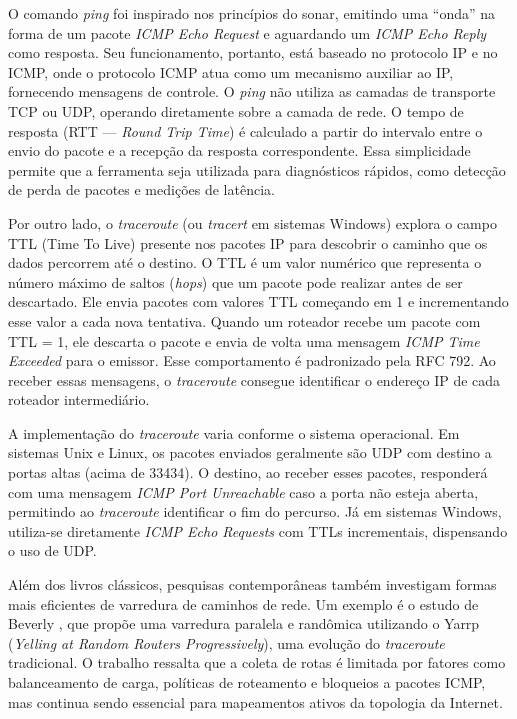 O comando \textit{ping} foi inspirado nos princípios do sonar, emitindo uma “onda” na forma de um pacote \textit{ICMP Echo Request} e aguardando um \textit{ICMP Echo Reply} como resposta. Seu funcionamento, portanto, está baseado no protocolo IP e no ICMP, onde o protocolo ICMP atua como um mecanismo auxiliar ao IP, fornecendo mensagens de controle. O \textit{ping} não utiliza as camadas de transporte TCP ou UDP, operando diretamente sobre a camada de rede. O tempo de resposta (RTT — \textit{Round Trip Time}) é calculado a partir do intervalo entre o envio do pacote e a recepção da resposta correspondente. Essa simplicidade permite que a ferramenta seja utilizada para diagnósticos rápidos, como detecção de perda de pacotes e medições de latência. \cite[p. 465--467]{tanenbaum2011}

Por outro lado, o \textit{traceroute} (ou \textit{tracert} em sistemas Windows) explora o campo TTL (Time To Live) presente nos pacotes IP para descobrir o caminho que os dados percorrem até o destino. O TTL é um valor numérico que representa o número máximo de saltos (\textit{hops}) que um pacote pode realizar antes de ser descartado. Ele envia pacotes com valores TTL começando em 1 e incrementando esse valor a cada nova tentativa. Quando um roteador recebe um pacote com TTL = 1, ele descarta o pacote e envia de volta uma mensagem \textit{ICMP Time Exceeded} para o emissor. Esse comportamento é padronizado pela RFC 792. Ao receber essas mensagens, o \textit{traceroute} consegue identificar o endereço IP de cada roteador intermediário. \cite[p. 465--467]{tanenbaum2011} \cite{rfc792}

A implementação do \textit{traceroute} varia conforme o sistema operacional. Em sistemas Unix e Linux, os pacotes enviados geralmente são UDP com destino a portas altas (acima de 33434). O destino, ao receber esses pacotes, responderá com uma mensagem \textit{ICMP Port Unreachable} caso a porta não esteja aberta, permitindo ao \textit{traceroute} identificar o fim do percurso. Já em sistemas Windows, utiliza-se diretamente \textit{ICMP Echo Requests} com TTLs incrementais, dispensando o uso de UDP. \cite{rfc792}

Além dos livros clássicos, pesquisas contemporâneas também investigam formas mais eficientes de varredura de caminhos de rede. Um exemplo é o estudo de Beverly \cite{beverly2016}, que propõe uma varredura paralela e randômica utilizando o Yarrp (\textit{Yelling at Random Routers Progressively}), uma evolução do \textit{traceroute} tradicional. O trabalho ressalta que a coleta de rotas é limitada por fatores como balanceamento de carga, políticas de roteamento e bloqueios a pacotes ICMP, mas continua sendo essencial para mapeamentos ativos da topologia da Internet.

